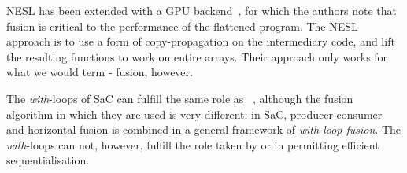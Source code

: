 NESL has been extended with a GPU backend~\cite{bergstrom2012nested},
for which the authors note that fusion is critical to the performance
of the flattened program.  The NESL approach is to use a form of
copy-propagation on the intermediary code, and lift the resulting
functions to work on entire arrays.  Their approach only works for
what we would term - fusion, however.

The \textit{with}-loops of SaC can fulfill the same role as
~\cite{Grelck:2005:WFD:2172471.2172483}, although the
fusion algorithm in which they are used is very different: in SaC,
producer-consumer and horizontal fusion is combined in a general
framework of \textit{with-loop fusion}.  The \textit{with}-loops can
not, however, fulfill the role taken by \StreamSeq{} or \StreamPar{}
in permitting efficient sequentialisation.


